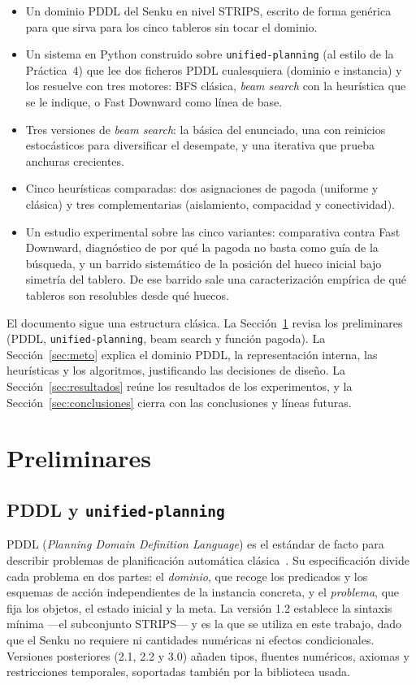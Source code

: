 \documentclass[conference,a4paper]{IEEEtran}
\begin{document}
\begin{itemize}
\item Un dominio PDDL del Senku en nivel STRIPS, escrito de forma genérica
  para que sirva para los cinco tableros sin tocar el dominio.
\item Un sistema en Python construido sobre \texttt{unified-planning} (al
  estilo de la Práctica~4) que lee dos ficheros PDDL cualesquiera (dominio
  e instancia) y los resuelve con tres motores: BFS clásica, \emph{beam
  search} con la heurística que se le indique, o Fast Downward como línea
  de base.
\item Tres versiones de \emph{beam search}: la básica del enunciado, una
  con reinicios estocásticos para diversificar el desempate, y una
  iterativa que prueba anchuras crecientes.
\item Cinco heurísticas comparadas: dos asignaciones de pagoda (uniforme y
  clásica) y tres complementarias (aislamiento, compacidad y
  conectividad).
\item Un estudio experimental sobre las cinco variantes: comparativa
  contra Fast Downward, diagnóstico de por qué la pagoda no basta como
  guía de la búsqueda, y un barrido sistemático de la posición del hueco
  inicial bajo simetría del tablero. De ese barrido sale una
  caracterización empírica de qué tableros son resolubles desde qué
  huecos.
\end{itemize}

El documento sigue una estructura clásica. La Sección~\ref{sec:prelim}
revisa los preliminares (PDDL, \texttt{unified-planning}, beam search y
función pagoda). La Sección~\ref{sec:meto} explica el dominio PDDL, la
representación interna, las heurísticas y los algoritmos, justificando las
decisiones de diseño. La Sección~\ref{sec:resultados} reúne los resultados
de los experimentos, y la Sección~\ref{sec:conclusiones} cierra con las
conclusiones y líneas futuras.


\section{Preliminares}
\label{sec:prelim}


\subsection{PDDL y \texttt{unified-planning}}

PDDL (\emph{Planning Domain Definition Language}) es el estándar de facto
para describir problemas de planificación automática
clásica~\cite{pddl-wiki}. Su especificación divide cada problema en dos
partes: el \emph{dominio}, que recoge los predicados y los esquemas de
acción independientes de la instancia concreta, y el \emph{problema}, que
fija los objetos, el estado inicial y la meta. La versión 1.2 establece la
sintaxis mínima ---el subconjunto STRIPS--- y es la que se utiliza en este
trabajo, dado que el Senku no requiere ni cantidades numéricas ni efectos
condicionales. Versiones posteriores (2.1, 2.2 y 3.0) añaden tipos,
fluentes numéricos, axiomas y restricciones temporales, soportadas
también por la biblioteca usada.
\end{document}
